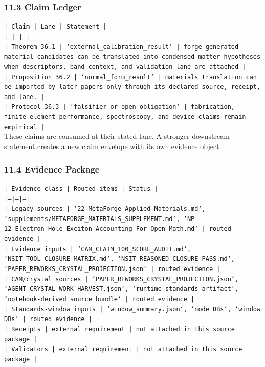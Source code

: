 \documentclass[11pt]{article}
\begin{document}
\subsubsection*{11.3 Claim Ledger}

\noindent\texttt{| Claim | Lane | Statement |}\\
\noindent\texttt{|---|---|---|}\\
\noindent\texttt{| Theorem 36.1 | `external\_calibration\_result` | forge-generated material candidates can be translated into condensed-matter hypotheses when descriptors, band context, and validation lane are attached |}\\
\noindent\texttt{| Proposition 36.2 | `normal\_form\_result` | materials translation can be imported by later papers only through its declared source, receipt, and lane. |}\\
\noindent\texttt{| Protocol 36.3 | `falsifier\_or\_open\_obligation` | fabrication, finite-element performance, spectroscopy, and device claims remain empirical |}\\

These claims are consumed at their stated lane. A stronger downstream statement
creates a new claim envelope with its own evidence object.

\subsubsection*{11.4 Evidence Package}

\noindent\texttt{| Evidence class | Routed items | Status |}\\
\noindent\texttt{|---|---|---|}\\
\noindent\texttt{| Legacy sources | `22\_MetaForge\_Applied\_Materials.md`, `supplements/METAFORGE\_MATERIALS\_SUPPLEMENT.md`, `NP-12\_Electron\_Hole\_Exciton\_Accounting\_For\_Open\_Math.md` | routed evidence |}\\
\noindent\texttt{| Evidence inputs | `CAM\_CLAIM\_100\_SCORE\_AUDIT.md`, `NSIT\_TOOL\_CLOSURE\_MATRIX.md`, `NSIT\_REASONED\_CLOSURE\_PASS.md`, `PAPER\_REWORKS\_CRYSTAL\_PROJECTION.json` | routed evidence |}\\
\noindent\texttt{| CAM/crystal sources | `PAPER\_REWORKS\_CRYSTAL\_PROJECTION.json`, `AGENT\_CRYSTAL\_WORK\_HARVEST.json`, `runtime standards artifact`, `notebook-derived source bundle` | routed evidence |}\\
\noindent\texttt{| Standards-window inputs | `window\_summary.json`, `node DBs`, `window DBs` | routed evidence |}\\
\noindent\texttt{| Receipts | external requirement | not attached in this source package |}\\
\noindent\texttt{| Validators | external requirement | not attached in this source package |}\\
\end{document}
